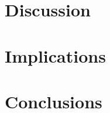 \section{Discussion}
\label{sec:ch3_discussion}
    

\section{Implications}
\label{sec:ch3_implications}
    

\section{Conclusions} \label{sec:ch3_conclusions}
    